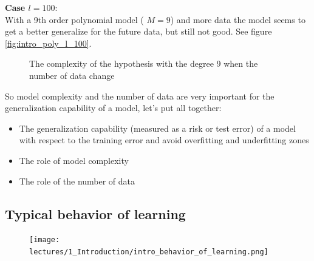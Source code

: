 \documentclass[../main.tex]{subfiles}
\begin{document}
\noindent \textbf{Case $l = 100$}:\\
With a 9th order polynomial model ( $M = 9$) and more data the model seems to get a better generalize for the future data, but still not good. See figure \ref{fig:intro_poly_l_100}.

\begin{figure}[ht]
  \centering
  \hfill
  \caption{The complexity of the hypothesis with the degree 9 when the number of data change}
\end{figure}

\noindent So model complexity and the number of data are very important for the generalization capability of a model, let's put all together:
\begin{itemize}
    \item The generalization capability (measured as a risk or test error) of a model with respect to the training error and avoid overfitting and underfitting zones
    \item The role of model complexity
    \item The role of the number of data
\end{itemize}

\subsection*{Typical behavior of learning}
\begin{figure}[ht]
    \centering
    \texttt{[image: lectures/1\_Introduction/intro\_behavior\_of\_learning.png]}
\end{figure}
\end{document}
